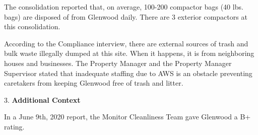 

The consolidation reported that, on average, 100-200 compactor bags (40 lbs. bags) are disposed of from Glenwood daily. There are 3 exterior compactors at this consolidation. 

 

According to the Compliance interview, there are external sources of trash and bulk waste illegally dumped at this site. When it happens, it is from neighboring houses and businesses. The Property Manager and the Property Manager Supervisor stated that inadequate staffing due to AWS is an obstacle preventing caretakers from keeping Glenwood free of trash and litter.

3. \textbf{Additional Context}

In a June 9th, 2020 report, the Monitor Cleanliness Team gave Glenwood a B+ rating. 